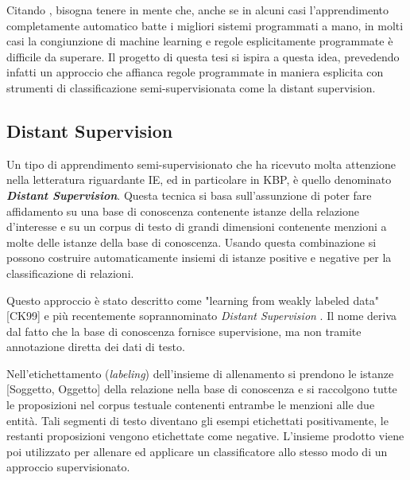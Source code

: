 Citando \citet{Grishman2012InformationEC}, bisogna tenere in mente che, anche se in alcuni casi l'apprendimento completamente automatico batte i migliori sistemi programmati a mano, in molti casi la congiunzione di machine learning e regole esplicitamente programmate è difficile da superare. Il progetto di questa tesi si ispira a questa idea, prevedendo infatti un approccio che affianca regole programmate in maniera esplicita con strumenti di classificazione semi-supervisionata come la distant supervision.

\subsection{Distant Supervision}
\label{sec:literature_review:information_extraction:distant_supervision}
Un tipo di apprendimento semi-supervisionato che ha ricevuto molta attenzione nella letteratura riguardante IE, ed in particolare in KBP, è quello denominato \textit{\textbf{Distant Supervision}}. Questa tecnica si basa sull'assunzione di poter fare affidamento su una base di conoscenza contenente istanze della relazione d'interesse e su un corpus di testo di grandi dimensioni contenente menzioni a molte delle istanze della base di conoscenza. Usando questa combinazione si possono costruire automaticamente insiemi di istanze positive e negative per la classificazione di relazioni. 

Questo approccio è stato descritto come "learning from weakly labeled data" [CK99] e più recentemente soprannominato \textit{Distant Supervision} \cite{Mintz2009DistantSF}.
Il nome deriva dal fatto che la base di conoscenza fornisce supervisione, ma non tramite annotazione diretta dei dati di testo. 

Nell'etichettamento (\textit{labeling}) dell'insieme di allenamento si prendono le istanze [Soggetto, Oggetto] della relazione nella base di conoscenza e si raccolgono tutte le proposizioni nel corpus testuale contenenti entrambe le menzioni alle due entità. Tali segmenti di testo diventano gli esempi etichettati positivamente, le restanti proposizioni vengono etichettate come negative. L'insieme prodotto viene poi utilizzato per allenare ed applicare un classificatore allo stesso modo di un approccio supervisionato.


